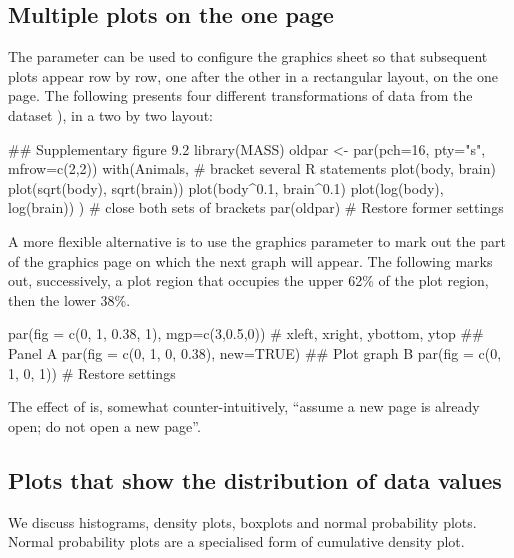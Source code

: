 \subsection{Multiple plots on the one page}\label{ss:xplots}
The parameter  can be used to configure the graphics
sheet so that subsequent plots appear row by row, one after the
other in a rectangular layout, on the one page. The following
presents four different transformations of data from the dataset
), in a two by two layout:
\begin{Schunk}
\begin{Sinput}
## Supplementary figure 9.2
library(MASS)
oldpar <- par(pch=16, pty="s", mfrow=c(2,2))
with(Animals, {      # bracket several R statements
  plot(body, brain)
  plot(sqrt(body), sqrt(brain))
  plot(body^0.1, brain^0.1)
  plot(log(body), log(brain))
})                   # close both sets of brackets
par(oldpar)          # Restore former settings
\end{Sinput}
\end{Schunk}

A more flexible alternative is to use the graphics parameter
 to mark out the part of the graphics page on which the
next graph will appear.  The following marks out, successively,
a plot region that occupies the upper 62\% of the plot region,
then the lower 38\%.
\begin{Schunk}
\begin{Sinput}
par(fig = c(0, 1, 0.38, 1), mgp=c(3,0.5,0))
          # xleft, xright, ybottom, ytop
## Panel A
par(fig = c(0, 1, 0, 0.38), new=TRUE)
## Plot graph B
par(fig = c(0, 1, 0, 1))    # Restore settings
\end{Sinput}
\end{Schunk}
The effect of  is, somewhat
counter-intuitively, ``assume a new page is already open; do not open
a new page''.

\subsection{Plots that show the distribution of data values}
  We discuss
histograms, density plots, boxplots and normal probability plots.
Normal probability plots are a specialised form of cumulative
density plot.

